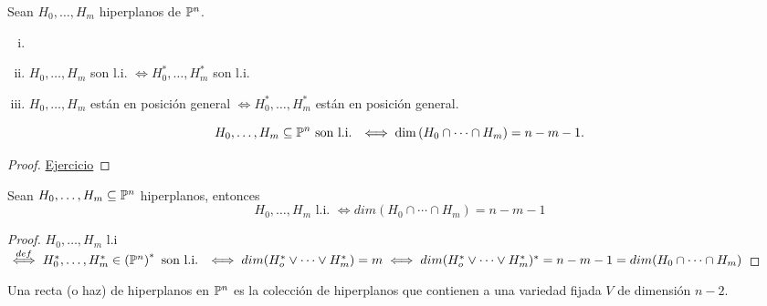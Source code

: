 \begin{defi}
    Sean $H_0, \dots, H_m$ hiperplanos de $\mathbb{P}^n$.
    \begin{enumerate}[(i)]
        \item[]
        \item $H_0, \dots, H_m$ son l.i. $\iff H_0^*, \dots, H_m^*$ son l.i.
        \item $H_0, \dots, H_m$ están en posición general $\iff H_0^*, \dots, H_m^*$ están en posición general.
    \end{enumerate}
\end{defi}
\begin{prop}
    \[
        H_0, \dots, H_m \subseteq \mathbb{P}^n \text{ son l.i. } \iff \dim \left( H_0 \cap \cdots \cap H_m \right) = n-m-1.
    \]
\end{prop}
\begin{proof}
    \underline{Ejercicio}
\end{proof}

\begin{prop}
    Sean $H_0,\dots,H_m \subseteq \mathbb{P}^n$ hiperplanos, entonces
    \[
        H_0,\dots, H_m \text{ l.i. } \iff dim(H_0 \cap \cdots \cap H_m) = n - m - 1
    \]
\end{prop}
\begin{proof}
    $H_0,\dots,H_m$ l.i $\stackrel{def}{\iff} H_0^*,\dots,H_m^* \in \left(\mathbb{P}^n\right)^* \text{ son l.i. }
    \iff dim(H_o^* \vee \cdots \vee H_m^*) = m \iff dim(H_o^* \vee \cdots \vee H_m^*)^* = n - m-1
    = dim(H_0 \cap \cdots \cap H_m)$
\end{proof}

\begin{defi}
    Una recta (o haz) de hiperplanos en $\mathbb{P}^n$ es la colección de hiperplanos que contienen a una variedad
    fijada $V$ de dimensión $n-2$.
\end{defi}


